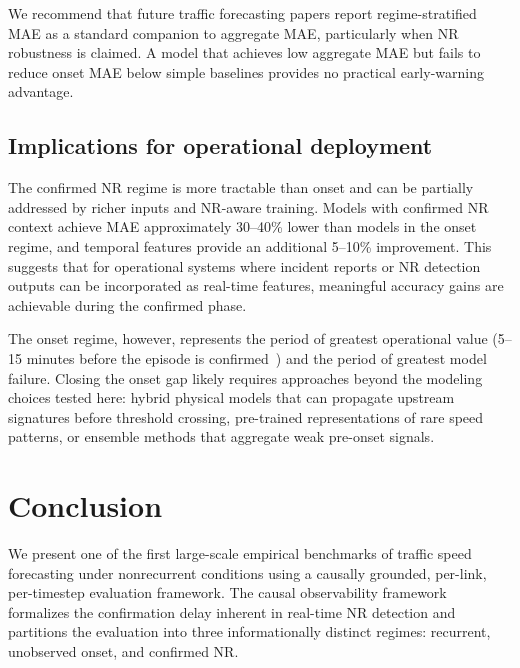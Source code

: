 \documentclass[a4paper]{cas-sc}
\begin{document}
We recommend that future traffic forecasting papers report
regime-stratified MAE as a standard companion to aggregate MAE,
particularly when NR robustness is claimed.
A model that achieves low aggregate MAE but fails to reduce onset MAE
below simple baselines provides no practical early-warning advantage.

\subsection{Implications for operational deployment}

The confirmed NR regime is more tractable than onset and can be
partially addressed by richer inputs and NR-aware training.
Models with confirmed NR context achieve MAE approximately 30--40\%
lower than models in the onset regime, and temporal features provide
an additional 5--10\% improvement.
This suggests that for operational systems where incident reports
or NR detection outputs can be incorporated as real-time features,
meaningful accuracy gains are achievable during the confirmed phase.

The onset regime, however, represents the period of greatest
operational value (5--15 minutes before the episode is confirmed~\citep{fhwa2025})
and the period of greatest model failure.
Closing the onset gap likely requires approaches beyond the modeling
choices tested here: hybrid physical models that can propagate
upstream signatures before threshold crossing, pre-trained
representations of rare speed patterns, or ensemble methods that
aggregate weak pre-onset signals.

\section{Conclusion}
\label{sec:conclusion}

We present one of the first large-scale empirical benchmarks of
traffic speed forecasting under nonrecurrent conditions using a
causally grounded, per-link, per-timestep evaluation framework.
The causal observability framework formalizes the confirmation delay
inherent in real-time NR detection and partitions the evaluation
into three informationally distinct regimes: recurrent, unobserved
onset, and confirmed NR.
\end{document}
